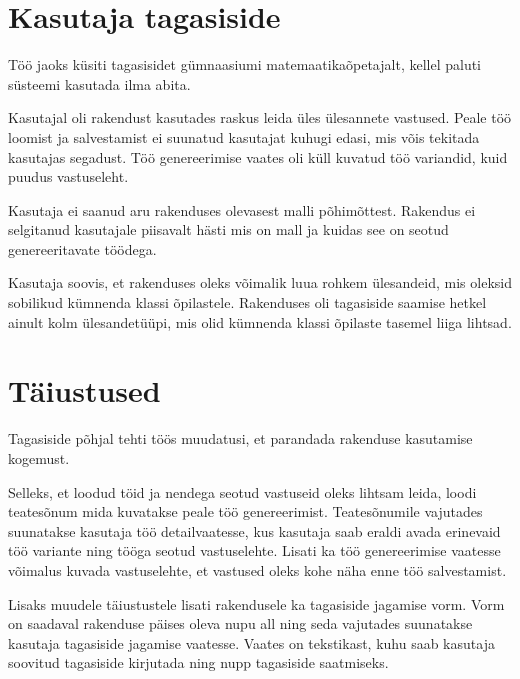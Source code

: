 \section{Kasutaja tagasiside}

Töö jaoks küsiti tagasisidet gümnaasiumi matemaatikaõpetajalt, kellel paluti süsteemi kasutada ilma abita.

Kasutajal oli rakendust kasutades raskus leida üles ülesannete vastused. Peale töö loomist ja salvestamist ei suunatud kasutajat kuhugi edasi, mis võis tekitada kasutajas segadust. Töö genereerimise vaates oli küll kuvatud töö variandid, kuid puudus vastuseleht.

Kasutaja ei saanud aru rakenduses olevasest malli põhimõttest. Rakendus ei selgitanud kasutajale piisavalt hästi mis on mall ja kuidas see on seotud genereeritavate töödega.

Kasutaja soovis, et rakenduses oleks võimalik luua rohkem ülesandeid, mis oleksid sobilikud kümnenda klassi õpilastele. Rakenduses oli tagasiside saamise hetkel ainult kolm ülesandetüüpi, mis olid kümnenda klassi õpilaste tasemel liiga lihtsad.

\section{Täiustused}

Tagasiside põhjal tehti töös muudatusi, et parandada rakenduse kasutamise kogemust.

Selleks, et loodud töid ja nendega seotud vastuseid oleks lihtsam leida, loodi teatesõnum mida kuvatakse peale töö genereerimist. Teatesõnumile vajutades suunatakse kasutaja töö detailvaatesse, kus kasutaja saab eraldi avada erinevaid töö variante ning tööga seotud vastuselehte. Lisati ka töö genereerimise vaatesse võimalus kuvada vastuselehte, et vastused oleks kohe näha enne töö salvestamist.

Lisaks muudele täiustustele lisati rakendusele ka tagasiside jagamise vorm. Vorm on saadaval rakenduse päises oleva nupu all ning seda vajutades suunatakse kasutaja tagasiside jagamise vaatesse. Vaates on tekstikast, kuhu saab kasutaja soovitud tagasiside kirjutada ning nupp tagasiside saatmiseks.
